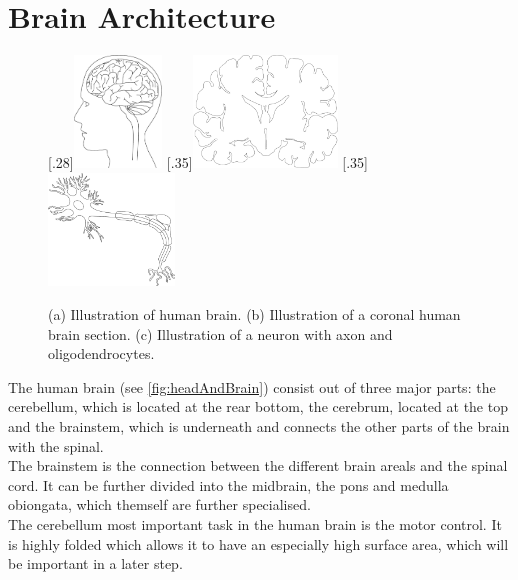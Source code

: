 \section{Brain Architecture}
% 
\begin{figure}[!t]
\centering
\subcaptionbox{\label{fig:headAndBrain}}[.28\textwidth]{\includegraphics[height=3cm]{gfx/neuroanatomy/human-brain-profile.pdf}}
\subcaptionbox{}[.35\textwidth]{\includegraphics[height=3cm]{gfx/neuroanatomy/human-brain-section.pdf}}
\subcaptionbox{\label{fig:nerveFiber}}[.35\textwidth]{\includegraphics[height=3cm]{gfx/neuroanatomy/neuron-axon.pdf}}
\caption{(a) Illustration of human brain. (b) Illustration of a coronal human brain section. (c) Illustration of a neuron with axon and oligodendrocytes.}
\label{fig:human-brain}
\end{figure}
% 
The human brain (see \cref{fig:headAndBrain}) consist out of three major parts: the cerebellum, which is located at the rear bottom, the cerebrum, located at the top and the brainstem, which is underneath and connects the other parts of the brain with the spinal.
\\
The brainstem is the connection between the different brain areals and the spinal cord.
It can be further divided into the midbrain, the pons and medulla obiongata, which themself are further specialised.
\\
The cerebellum most important task in the human brain is the motor control.
It is highly folded which allows it to have an especially high surface area, which will be important in a later step.
